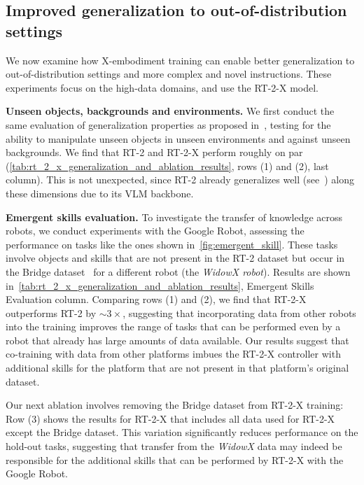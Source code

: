 \documentclass[letterpaper, 10 pt, conference]{ieeeconf}  %
\newcommand{\edrbot}{Google Robot\xspace}
\newcommand{\cro}{X}
\begin{document}
\subsection{Improved generalization to out-of-distribution settings}
\vspace{-0.1em}

We now examine how \cro-embodiment training can enable better generalization to out-of-distribution settings and more complex and novel instructions. These experiments focus on the high-data domains, and use the RT-2-X model.

\textbf{Unseen objects, backgrounds and environments.} 
We first conduct the same evaluation of generalization properties as proposed in~\cite{brohan2023rt2}, testing for the ability to manipulate unseen objects in unseen environments and against unseen backgrounds.
We find that RT-2 and RT-2-X perform roughly on par (\cref{tab:rt_2_x_generalization_and_ablation_results}, rows (1) and (2), last column). This is not unexpected, since RT-2 already generalizes well (see~\cite{brohan2023rt2}) along these dimensions due to its VLM backbone.

\textbf{Emergent skills evaluation.}
To investigate the transfer of knowledge across robots, we conduct experiments with the \edrbot, assessing the performance on tasks like the ones shown in~\cref{fig:emergent_skill}. These tasks involve objects and skills that are not present in the RT-2 dataset but occur in the Bridge dataset~\cite{walke2023bridgedata} for a different robot (the \textit{WidowX robot}).
Results are shown in~\cref{tab:rt_2_x_generalization_and_ablation_results}, Emergent Skills Evaluation column. Comparing rows (1) and (2), we find that RT-2-X outperforms RT-2 by  $\sim3\times$, suggesting that  incorporating data from other robots into the training improves the range of tasks that can be performed even by a robot that already has large amounts of data available. 
Our results suggest that co-training with data from other platforms imbues the RT-2-X controller with additional skills for the platform that are not present in that platform's original dataset. 

Our next ablation involves removing the Bridge dataset from RT-2-X training: Row (3) shows the results for RT-2-X that includes all data used for RT-2-X except the Bridge dataset. This variation significantly reduces performance on the hold-out tasks, suggesting that transfer from the \textit{WidowX} data may indeed be responsible for the additional skills that can be performed by RT-2-X with the \edrbot.
\end{document}
